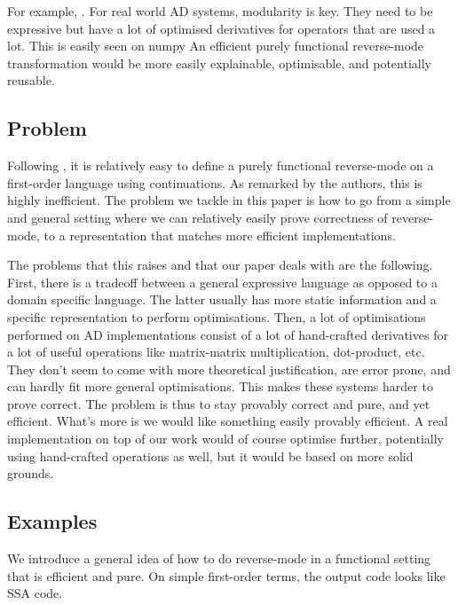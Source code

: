 For example, .
For real world AD systems, modularity is key. They need to be expressive but have a lot of optimised derivatives for operators that are used a lot.
This is easily seen on numpy 
An efficient purely functional reverse-mode transformation would be more easily explainable, optimisable, and potentially reusable.

\subsection{Problem}

Following \cite{pearlmutter2008reverse}, it is relatively easy to define a purely functional reverse-mode on a first-order language using continuations. 
As remarked by the authors, this is highly inefficient. 
The problem we tackle in this paper is how to go from a simple and general setting where we can relatively easily prove correctness of reverse-mode, 
to a representation that matches more efficient implementations.

The problems that this raises and that our paper deals with are the following. First, there is a tradeoff between a general expressive language 
as opposed to a domain specific language. The latter usually has more static information and a specific representation to perform optimisations.
Then, a lot of optimisations performed on AD implementations consist of a lot of hand-crafted derivatives for a lot of useful operations like matrix-matrix multiplication, dot-product, etc.
They don't seem to come with more theoretical justification, are error prone, and can hardly fit more general optimisations.
This makes these systems harder to prove correct. The problem is thus to stay provably correct and pure, and yet efficient. What's more is we would like something easily provably efficient. 
A real implementation on top of our work would of course optimise further, potentially using hand-crafted operations as well, but it would be based on more solid grounds.

\subsection{Examples}

We introduce a general idea of how to do reverse-mode in a functional setting that is efficient and pure. 
On simple first-order terms, the output code looks like SSA code\cite{}.

